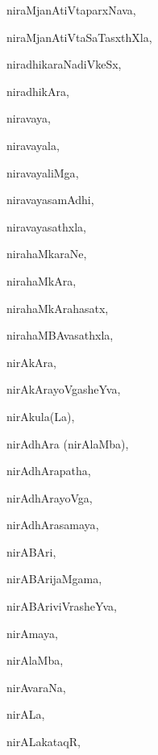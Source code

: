 \begin{multicols}{3}
{\noindent
{niraMjanAtiVtaparxNava}, \pageref{niraMjanAtiVtaparxNava}

\noindent
{niraMjanAtiVtaSaTasxthXla}, \pageref{niraMjanAtiVtaSaTasxthXla}

\noindent
{niradhikaraNadiVkeSx}, \pageref{niradhikaraNadiVkeSx}

\noindent
{niradhikAra}, \pageref{niradhikAra}

\noindent
{niravaya}, \pageref{niravaya}

\noindent
{niravayala}, \pageref{niravayala}

\noindent
{niravayaliMga}, \pageref{niravayaliMga}

\noindent
{niravayasamAdhi}, \pageref{niravayasamAdhi}

\noindent
{niravayasathxla}, \pageref{niravayasathxla}

\noindent
{nirahaMkaraNe}, \pageref{nirahaMkaraNe}

\noindent
{nirahaMkAra}, \pageref{nirahaMkAra}

\noindent
{nirahaMkArahasatx}, \pageref{nirahaMkArahasatx}

\noindent
{nirahaMBAvasathxla}, \pageref{nirahaMBAvasathxla}

\noindent
{nirAkAra}, \pageref{nirAkAra}

\noindent
{nirAkArayoVgasheYva}, \pageref{nirAkArayoVgasheYva}

\noindent
{nirAkula(La)}, \pageref{nirAkulaLa}

\noindent
{nirAdhAra (nirAlaMba)}, \pageref{nirAdhAra nirAlaMba}

\noindent
{nirAdhArapatha}, \pageref{nirAdhArapatha}

\noindent
{nirAdhArayoVga}, \pageref{nirAdhArayoVga}

\noindent
{nirAdhArasamaya}, \pageref{nirAdhArasamaya}

\noindent
{nirABAri}, \pageref{nirABAri}

\noindent
{nirABArijaMgama}, \pageref{nirABArijaMgama}

\noindent
{nirABAriviVrasheYva}, \pageref{nirABAriviVrasheYva}

\noindent
{nirAmaya}, \pageref{nirAmaya}

\noindent
{nirAlaMba}, \pageref{nirAlaMba}

\noindent
{nirAvaraNa}, \pageref{nirAvaraNa}

\noindent
{nirALa}, \pageref{nirALa}

\noindent
{nirALakataqR}, \pageref{nirALakataqR}

}
\end{multicols}
